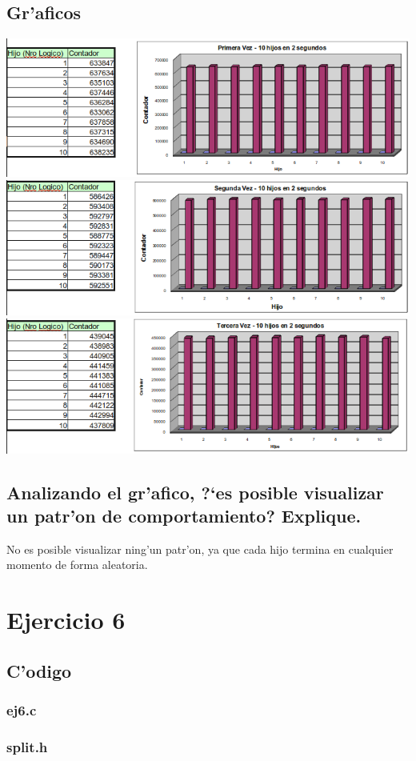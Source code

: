 \documentclass[a4paper,8pt]{article}
\newcommand{\?}{?`}
\begin{document}
\subsection[Punto B]{Gr'aficos}
\begin{center}
 \includegraphics[scale=0.45,keepaspectratio=true]{./ej4/diag1.png}
 \includegraphics[scale=0.45,keepaspectratio=true]{./ej4/diag2.png}
 \includegraphics[scale=0.45,keepaspectratio=true]{./ej4/diag3.png}
\end{center}


\subsection[Punto C]{Analizando el gr'afico, \?es posible visualizar un patr'on de comportamiento? Explique.}
No es posible visualizar ning'un patr'on, ya que cada hijo termina en cualquier momento de forma aleatoria.

\section{Ejercicio 6}
\subsection{C'odigo}
\subsubsection{ej6.c}

\subsubsection{split.h}

\end{document}
